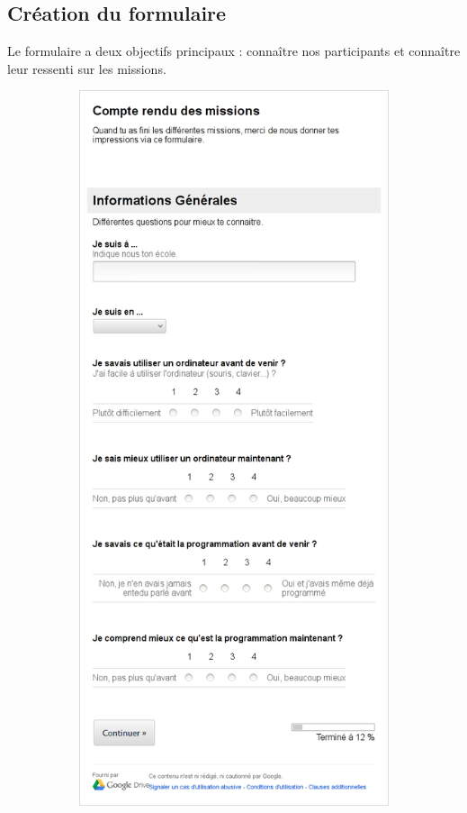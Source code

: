\subsection{Création du formulaire}
Le formulaire a deux objectifs principaux : connaître nos participants et connaître leur ressenti sur les \glspl{mission}.
\begin{figure}%
  \begin{center}
    \begin{subfigure}[b]{.49\textwidth}
      \includegraphics[width=\textwidth]{content/8-validation/images/form-user}

\end{subfigure}
\end{center}
\end{figure}
